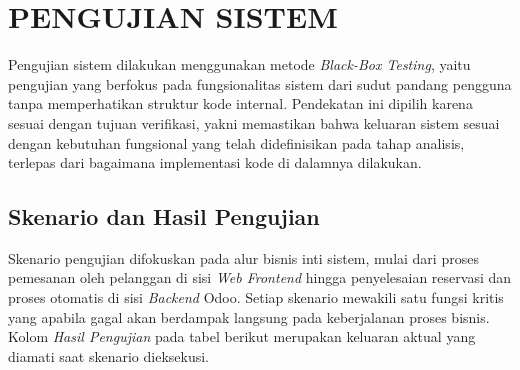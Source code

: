 \documentclass[conference]{IEEEtran}
\begin{document}
\section{PENGUJIAN SISTEM}

Pengujian sistem dilakukan menggunakan metode \textit{Black-Box Testing}, yaitu pengujian yang berfokus pada fungsionalitas sistem dari sudut pandang pengguna tanpa memperhatikan struktur kode internal. Pendekatan ini dipilih karena sesuai dengan tujuan verifikasi, yakni memastikan bahwa keluaran sistem sesuai dengan kebutuhan fungsional yang telah didefinisikan pada tahap analisis, terlepas dari bagaimana implementasi kode di dalamnya dilakukan.

\subsection{Skenario dan Hasil Pengujian}
Skenario pengujian difokuskan pada alur bisnis inti sistem, mulai dari proses pemesanan oleh pelanggan di sisi \textit{Web Frontend} hingga penyelesaian reservasi dan proses otomatis di sisi \textit{Backend} Odoo. Setiap skenario mewakili satu fungsi kritis yang apabila gagal akan berdampak langsung pada keberjalanan proses bisnis. Kolom \textit{Hasil Pengujian} pada tabel berikut merupakan keluaran aktual yang diamati saat skenario dieksekusi.
\end{document}
